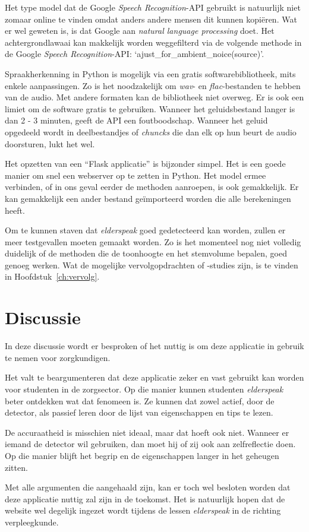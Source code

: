 Het type model dat de Google \textit{Speech Recognition}-API gebruikt is natuurlijk niet zomaar online te vinden omdat anders andere mensen dit kunnen kopiëren. Wat er wel geweten is, is dat Google aan \textit{natural language processing} doet.
Het achtergrondlawaai kan makkelijk worden weggefilterd via de volgende methode in de Google \textit{Speech Recognition}-API: `ajust\_for\_ambient\_noice(source)'.

Spraakherkenning in Python is mogelijk via een gratis softwarebibliotheek, mits enkele aanpassingen. Zo is het noodzakelijk om \textit{wav}- en \textit{flac}-bestanden te hebben van de audio. Met andere formaten kan de bibliotheek niet overweg. Er is ook een limiet om de software gratis te gebruiken. Wanneer het geluidsbestand langer is dan 2 - 3 minuten, geeft de API een foutboodschap. Wanneer het geluid opgedeeld wordt in deelbestandjes of \textit{chuncks} die dan elk op hun beurt de audio doorsturen, lukt het wel.

Het opzetten van een ``Flask applicatie'' is bijzonder simpel. Het is een goede manier om snel een webserver op te zetten in Python. Het model ermee verbinden, of in ons geval eerder de methoden aanroepen, is ook gemakkelijk. Er kan gemakkelijk een ander bestand geïmporteerd worden die alle berekeningen heeft.

Om te kunnen staven dat \textit{elderspeak} goed gedetecteerd kan worden, zullen er meer testgevallen moeten gemaakt worden. Zo is het momenteel nog niet volledig duidelijk of de methoden die de toonhoogte en het stemvolume bepalen, goed genoeg werken. Wat de mogelijke vervolgopdrachten of -studies zijn, is te vinden in Hoofdstuk~\ref{ch:vervolg}.



\section{Discussie}
In deze discussie wordt er besproken of het nuttig is om deze applicatie in gebruik te nemen voor zorgkundigen.

Het valt te beargumenteren dat deze applicatie zeker en vast gebruikt kan worden voor studenten in de zorgsector. Op die manier kunnen studenten \textit{elderspeak} beter ontdekken wat dat fenomeen is. Ze kunnen dat zowel actief, door de detector, als passief leren door de lijst van eigenschappen en tips te lezen.

De accuraatheid is misschien niet ideaal, maar dat hoeft ook niet. Wanneer er iemand de detector wil gebruiken, dan moet hij of zij ook aan zelfreflectie doen. Op die manier blijft het begrip en de eigenschappen langer in het geheugen zitten.

Met alle argumenten die aangehaald zijn, kan er toch wel besloten worden dat deze applicatie nuttig zal zijn in de toekomst. Het is natuurlijk hopen dat de website wel degelijk ingezet wordt tijdens de lessen \textit{elderspeak} in de richting verpleegkunde.